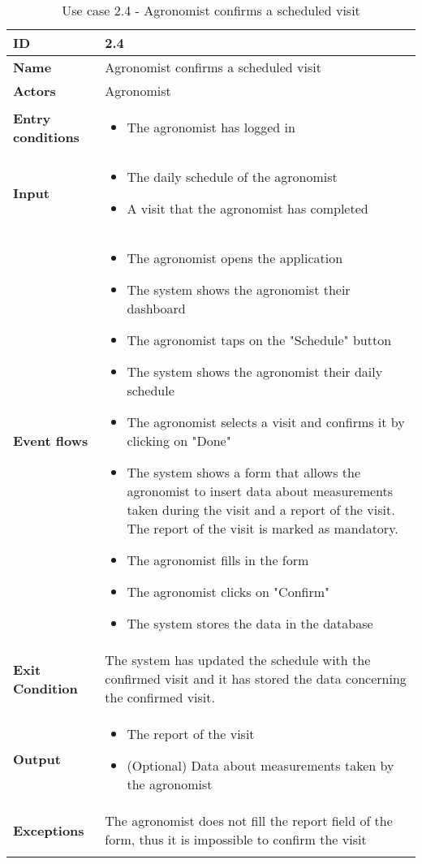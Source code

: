 \begin{longtable}[H]{ | l | p{10cm} | }
\hline
{\cellcolor[rgb]{0.753,0.753,0.753}}\textbf{ID}  & 2.4 \\ \hline
{\cellcolor[rgb]{0.753,0.753,0.753}}\textbf{Name} & Agronomist confirms a scheduled visit\\ \hline
{\cellcolor[rgb]{0.753,0.753,0.753}}\textbf{Actors} & Agronomist \\ \hline
{\cellcolor[rgb]{0.753,0.753,0.753}}\textbf{Entry conditions} &
\begin{itemize}
    \item The agronomist has logged in
\end{itemize}
\\ \hline
{\cellcolor[rgb]{0.753,0.753,0.753}}\textbf{Input} &
\begin{itemize}
    \item The daily schedule of the agronomist
    \item A visit that the agronomist has completed
\end{itemize}
\\ \hline
{\cellcolor[rgb]{0.753,0.753,0.753}}\textbf{Event flows} &
\begin{itemize}
    \item The agronomist opens the application
    \item The system shows the agronomist their dashboard
    \item The agronomist taps on the "Schedule" button
    \item The system shows the agronomist their daily schedule
    \item The agronomist selects a visit and confirms it by clicking on "Done"
    \item The system shows a form that allows the agronomist to insert data about measurements taken during the visit and a report of the visit. The report of the visit is marked as mandatory.
    \item The agronomist fills in the form
    \item The agronomist clicks on "Confirm"
    \item The system stores the data in the database
\end{itemize}
\\ \hline
{\cellcolor[rgb]{0.753,0.753,0.753}}\textbf{Exit Condition} & The system has updated the schedule with the confirmed visit and it has stored the data concerning the confirmed visit.\\ \hline
{\cellcolor[rgb]{0.753,0.753,0.753}}\textbf{Output} & 
\begin{itemize}
    \item The report of the visit
    \item (Optional) Data about measurements taken by the agronomist
\end{itemize}
\\ \hline
{\cellcolor[rgb]{0.753,0.753,0.753}}\textbf{Exceptions} &
The agronomist does not fill the report field of the form, thus it is impossible to confirm the visit
\\ \hline
\caption{Use case 2.4 - Agronomist confirms a scheduled visit}
\\
\end{longtable}